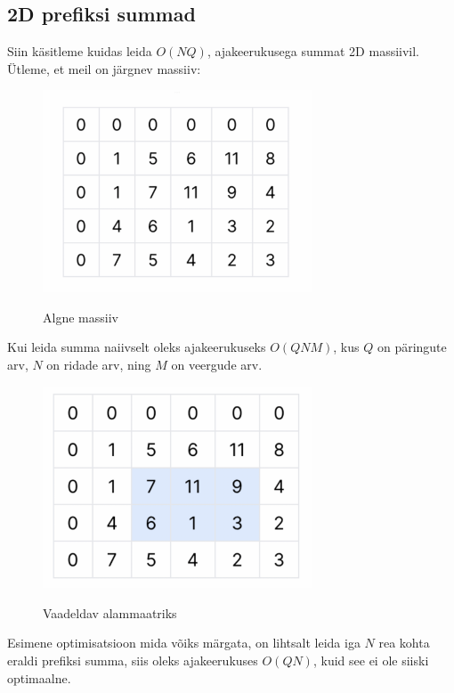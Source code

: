 \documentclass{trkut}
\begin{document}
\begin{appendices}
    \chapter{2D prefiksi summad}\label{lisa12}
    \tiny
    \normalsize
Siin käsitleme kuidas leida $O(NQ)$, ajakeerukusega summat 2D massiivil.
Ütleme, et meil on järgnev massiiv:
  \begin{figure}[H]%
    \includegraphics[width=8cm]{pr1.png}%
    \caption{Algne massiiv}%
    \label{EMaxx}%
\end{figure}
Kui leida summa naiivselt oleks ajakeerukuseks $O(QNM)$, kus $Q$ on päringute arv, $N$ on ridade arv, ning $M$ on veergude arv.
\begin{figure}[H]%
    \includegraphics[width=8cm]{pr4.png}%
    \caption{Vaadeldav alammaatriks}%
    \label{EMaxx}%
\end{figure}

Esimene optimisatsioon mida võiks märgata, on lihtsalt leida iga $N$ rea kohta eraldi prefiksi summa, siis oleks ajakeerukuses $O(QN)$, kuid see ei ole siiski optimaalne.


\end{appendices}
\end{document}
